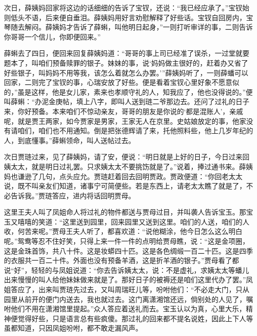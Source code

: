 \begin{parag}
    次日，薛姨妈回家将这边的话细细的告诉了宝钗，还说：“我已经应承了。”宝钗始则低头不语，后来便自垂泪。薛姨妈用好言劝慰解释了好些话。宝钗自回房内，宝琴随去解闷。薛姨妈才告诉了薛蝌，叫他明日起身，”一则打听审详的事，二则告诉你哥哥一个信儿，你即便回来。”
\end{parag}


\begin{parag}
    薛蝌去了四日，便回来回复薛姨妈道：“哥哥的事上司已经准了误杀，一过堂就要题本了，叫咱们预备赎罪的银子。妹妹的事，说‘妈妈做主很好的，赶着办又省了好些银子，叫妈妈不用等我，该怎么着就怎么办罢。’”薛姨妈听了，一则薛蟠可以回家，二则完了宝钗的事，心瑞安放了好些。便是看着宝钗心里好象不愿意似的，”虽是这样，他是女儿家，素来也孝顺守礼的人，知我应了，他也没得说的。”便叫薛蝌：“办泥金庚帖，填上八字，即叫人送到琏二爷那边去。还问了过礼的日子来，你好预备。本来咱们不惊动亲友，哥哥的朋友是你说的‘都是混账人’，亲戚呢，就是贾王两家，如今贾家是男家，王家无人在京里。史姑娘放定的事，他家没有请咱们，咱们也不用通知。倒是把张德辉请了来，托他照料些，他上几岁年纪的人，到底懂事。”薛蝌领命，叫人送帖过去。
\end{parag}


\begin{parag}
    次日贾琏过来，见了薛姨妈，请了安，便说：“明日就是上好的日子，今日过来回姨太太，就是明日过礼罢。只求姨太太不要挑饬就是了。”说着，捧过通书来。薛姨妈也谦逊了几句，点头应允。贾琏赶着回去回明贾政。贾政便道：“你回老太太说，既不叫亲友们知道，诸事宁可简便些。若是东西上，请老太太瞧了就是了，不必告诉我。”贾琏答应，进内将话回明贾母。
\end{parag}


\begin{parag}
    这里王夫人叫了凤姐命人将过礼的物件都送与贾母过目，并叫袭人告诉宝玉。那宝玉又嘻嘻的笑道：“这里送到园里，回来园里又送到这里。咱们的人送，咱们的人收，何苦来呢。”贾母王夫人听了，都喜欢道：“说他糊涂，他今日怎么这么明白呢。”鸳鸯等忍不住好笑，只得上来一件一件的点明给贾母瞧，说：“这是金项圈，这是金珠首饰，共八十件。这是妆蟒四十匹。这是各色绸缎一百二十匹。这是四季的衣服共一百二十件。外面也没有预备羊酒，这是折羊酒的银子。”贾母看了都说“好”，轻轻的与凤姐说道：“你去告诉姨太太，说：不是虚礼，求姨太太等蟠儿出来慢慢的叫人给他妹妹做来就是了。那好日子的被褥还是咱们这里代办了罢。”凤姐答应了，出来叫贾琏先过去，又叫周瑞旺儿等，吩咐他们：“不必走大门，只从园里从前开的便门内送去，我也就过去。这门离潇湘馆还远，倘别处的人见了，嘱咐他们不用在潇湘馆里提起。”众人答应着送礼而去。宝玉认以为真，心里大乐，精神便觉得好些，只是语言总有些疯傻。那过礼的回来都不提名说姓，因此上下人等虽都知道，只因凤姐吩咐，都不敢走漏风声。
\end{parag}


